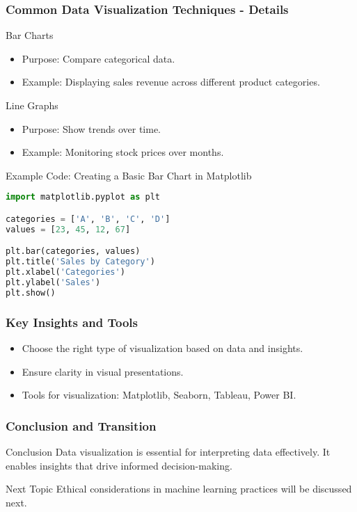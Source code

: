 \documentclass[aspectratio=169]{beamer}
\begin{document}
\begin{frame}[fragile]
    \frametitle{Common Data Visualization Techniques - Details}
    \begin{block}{Bar Charts}
        \begin{itemize}
            \item Purpose: Compare categorical data.
            \item Example: Displaying sales revenue across different product categories.
        \end{itemize}
    \end{block}
    
    \begin{block}{Line Graphs}
        \begin{itemize}
            \item Purpose: Show trends over time.
            \item Example: Monitoring stock prices over months.
        \end{itemize}
    \end{block}
    
    \begin{block}{Example Code: Creating a Basic Bar Chart in Matplotlib}
        \begin{lstlisting}[language=Python]
import matplotlib.pyplot as plt

categories = ['A', 'B', 'C', 'D']
values = [23, 45, 12, 67]

plt.bar(categories, values)
plt.title('Sales by Category')
plt.xlabel('Categories')
plt.ylabel('Sales')
plt.show()
        \end{lstlisting}
    \end{block}
\end{frame}

\begin{frame}
    \frametitle{Key Insights and Tools}
    \begin{itemize}
        \item Choose the right type of visualization based on data and insights.
        \item Ensure clarity in visual presentations.
        \item Tools for visualization: Matplotlib, Seaborn, Tableau, Power BI.
    \end{itemize}
\end{frame}

\begin{frame}
    \frametitle{Conclusion and Transition}
    \begin{block}{Conclusion}
        Data visualization is essential for interpreting data effectively. It enables insights that drive informed decision-making.
    \end{block}
    \begin{block}{Next Topic}
        Ethical considerations in machine learning practices will be discussed next.
    \end{block}
\end{frame}
\end{document}
